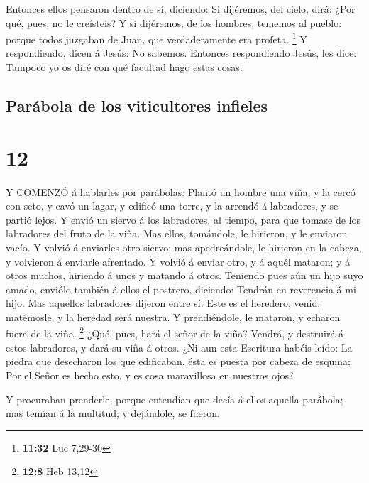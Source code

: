 Entonces ellos pensaron dentro de sí, diciendo: Si
dijéremos, del cielo, dirá: ¿Por qué, pues, no le creísteis?
 Y si dijéremos, de los hombres, tememos al pueblo: porque
todos juzgaban de Juan, que verdaderamente era profeta. \footnote{\textbf{11:32}
  Luc 7,29-30}  Y respondiendo, dicen á Jesús: No sabemos.
Entonces respondiendo Jesús, les dice: Tampoco yo os diré con qué
facultad hago estas cosas.

\hypertarget{paruxe1bola-de-los-viticultores-infieles}{%
\subsection{Parábola de los viticultores
infieles}\label{paruxe1bola-de-los-viticultores-infieles}}

\hypertarget{section-11}{%
\section{12}\label{section-11}}

 Y COMENZÓ á hablarles por parábolas: Plantó un hombre una
viña, y la cercó con seto, y cavó un lagar, y edificó una torre, y la
arrendó á labradores, y se partió lejos.  Y envió un siervo
á los labradores, al tiempo, para que tomase de los labradores del fruto
de la viña.  Mas ellos, tomándole, le hirieron, y le
enviaron vacío.  Y volvió á enviarles otro siervo; mas
apedreándole, le hirieron en la cabeza, y volvieron á enviarle
afrentado.  Y volvió á enviar otro, y á aquél mataron; y á
otros muchos, hiriendo á unos y matando á otros.  Teniendo
pues aún un hijo suyo amado, enviólo también á ellos el postrero,
diciendo: Tendrán en reverencia á mi hijo.  Mas aquellos
labradores dijeron entre sí: Este es el heredero; venid, matémosle, y la
heredad será nuestra.  Y prendiéndole, le mataron, y echaron
fuera de la viña. \footnote{\textbf{12:8} Heb 13,12}  ¿Qué,
pues, hará el señor de la viña? Vendrá, y destruirá á estos labradores,
y dará su viña á otros.  ¿Ni aun esta Escritura habéis
leído: La piedra que desecharon los que edificaban, ésta es puesta por
cabeza de esquina;  Por el Señor es hecho esto, y es cosa
maravillosa en nuestros ojos?

 Y procuraban prenderle, porque entendían que decía á ellos
aquella parábola; mas temían á la multitud; y dejándole, se fueron.

